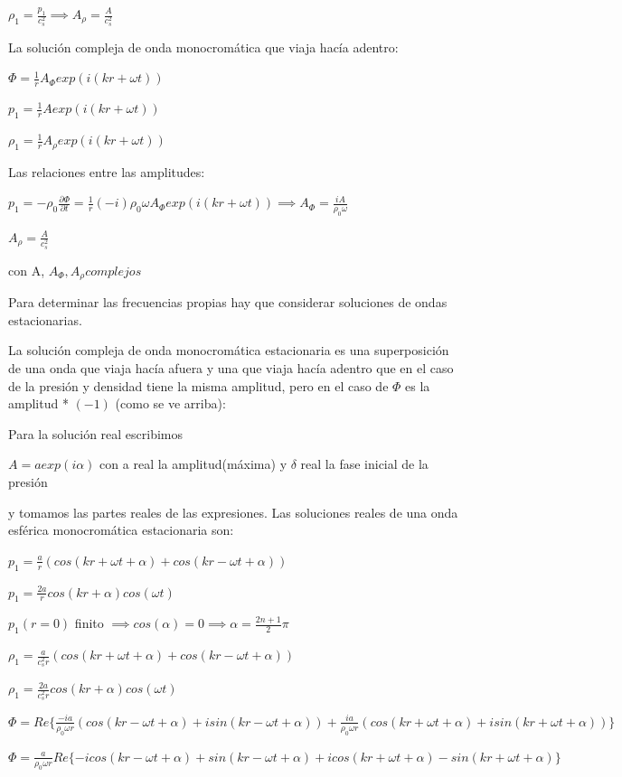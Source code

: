 \documentclass[10pt]{book}
\begin{document}
$ \rho_1 = \frac{p_1}{c_s^2} \implies A_{\rho} = \frac{A}{c_s^2} $


La solución  compleja de  onda monocromática que viaja hacía adentro:

$\Phi = \frac{1}{r} A_{\Phi}exp(i(kr + \omega t)) $

$p_1 = \frac{1}{r} A exp(i(kr + \omega t)) $

$\rho_1 = \frac{1}{r} A_{\rho} exp(i(kr + \omega t)) $

Las relaciones entre las amplitudes:

$p_1 = -\rho_0 \frac{\partial \Phi}{\partial t}  = \frac{1}{r} (-i) \rho_0 \omega A_{\Phi} exp(i(kr + \omega t)) \implies A_{\Phi} = \frac{i A}{\rho_0 \omega }$

$A_{\rho} = \frac{A}{c_s^2} $

con A, $A_{\Phi}, A_{\rho} complejos$


Para determinar las frecuencias propias hay que considerar soluciones de ondas estacionarias.

La solución compleja de onda monocromática estacionaria es una superposición de una onda que viaja hacía afuera y una que viaja hacía adentro que en el caso de la presión y densidad tiene la misma amplitud, pero en el caso de $\Phi$ es la amplitud * $(-1)$ (como se ve arriba):

Para la solución real escribimos 

$A = a exp(i \alpha)$ con a real la amplitud(máxima) y $\delta$ real la fase inicial de la presión 

y tomamos las partes reales de las expresiones. Las soluciones reales de una onda esférica monocromática estacionaria son:

$p_1 = \frac{a}{r} (cos(kr + \omega t + \alpha) + cos(kr - \omega t + \alpha)) $

$p_1 = \frac{2a}{r} cos(kr + \alpha) cos(\omega t) $

$p_1(r=0)$ finito $\implies cos(\alpha) = 0 \implies \alpha = \frac{2n+1}{2} \pi$

$\rho_1 = \frac{a}{c_s^2 r} (cos(kr + \omega t + \alpha) + cos(kr - \omega t + \alpha)) $

$\rho_1 = \frac{2 a}{c_s^2 r} cos(kr + \alpha) cos(\omega t)  $

$\Phi = Re \{ \frac{-i a}{\rho_0 \omega r}  (cos(kr - \omega t + \alpha)  + i sin(kr - \omega t + \alpha)) + \frac{i a}{\rho_0 \omega r}  (cos(kr + \omega t + \alpha)  + i sin(kr + \omega t + \alpha))   \} $

$\Phi = \frac{a}{\rho_0 \omega r} Re \{-i cos(kr - \omega t + \alpha)  +  sin(kr - \omega t + \alpha) +  i cos(kr + \omega t + \alpha)  - sin(kr + \omega t + \alpha)   \} $
\end{document}
